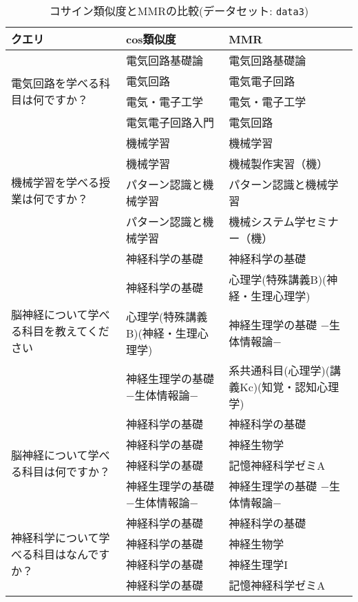 \begin{table}[htbp]
    \centering
    \caption{コサイン類似度とMMRの比較(データセット: \texttt{data3})}
    \label{tab:question_similarity_mmr_data3}
    {\small
    \begin{tabular}{|p{2.5cm}|p{5.5cm}|p{5.5cm}|}
        \hline
        \textbf{クエリ} & \textbf{cos類似度} & \textbf{MMR} \\ \hline
        \multirow{4}{2.5cm}{電気回路を学べる科目は何ですか？} & 
        電気回路基礎論 & 電気回路基礎論 \\
        & 電気回路 & 電気電子回路 \\
        & 電気・電子工学 & 電気・電子工学 \\
        & 電気電子回路入門 & 電気回路 \\ \hline
        \multirow{4}{2.5cm}{機械学習を学べる授業は何ですか？} & 
        機械学習 & 機械学習 \\
        & 機械学習 & 機械製作実習（機） \\
        & パターン認識と機械学習 & パターン認識と機械学習 \\
        & パターン認識と機械学習 & 機械システム学セミナー（機） \\ \hline
        \multirow{4}{2.5cm}{脳神経について学べる科目を教えてください} & 
        神経科学の基礎 & 神経科学の基礎 \\
        & 神経科学の基礎 & 心理学(特殊講義B)(神経・生理心理学) \\
        & 心理学(特殊講義B)(神経・生理心理学) & 神経生理学の基礎 −生体情報論− \\
        & 神経生理学の基礎 −生体情報論− & 系共通科目(心理学)(講義Kc)(知覚・認知心理学) \\ \hline
        \multirow{4}{2.5cm}{脳神経について学べる科目は何ですか？} & 
        神経科学の基礎 & 神経科学の基礎 \\
        & 神経科学の基礎 & 神経生物学 \\
        & 神経科学の基礎 & 記憶神経科学ゼミA \\
        & 神経生理学の基礎 −生体情報論− & 神経生理学の基礎 −生体情報論− \\ \hline
        \multirow{4}{2.5cm}{神経科学について学べる科目はなんですか？} & 
        神経科学の基礎 & 神経科学の基礎 \\
        & 神経科学の基礎 & 神経生物学 \\
        & 神経科学の基礎 & 神経生理学I \\
        & 神経科学の基礎 & 記憶神経科学ゼミA \\ \hline

\end{tabular}}
\end{table}
